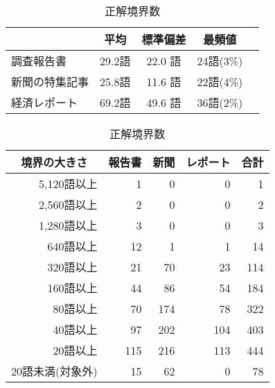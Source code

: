 \begin{table}[htbp]
\begin{minipage}[b]{7.5cm}
\begin{center}
\begin{tabular}{|l|c|c|c|c|}
                       & 平均   & 標準偏差 & 最頻値   \\ 
      \hline
      調査報告書       & 29.2語  & 22.0 語 & 24語(3\%)\\ 
      新聞の特集記事   & 25.8語  & 11.6 語 & 22語(4\%)\\ 
      経済レポート     & 69.2語  & 49.6 語 & 36語(2\%)\\ 
      \hline
    \end{tabular}
  \end{center}
  \bigskip
  \begin{center}
    \leavevmode
    \caption{正解境界数}
    \label{tab:正解境界数}
    \begin{tabular}{|r||r|r|r||r|}
    \hline
      \multicolumn{1}{|c||}{境界の大きさ}
      & \multicolumn{1}{c|}{報告書}
      & \multicolumn{1}{c|}{新聞}
      & \multicolumn{1}{c||}{レポート}
      & \multicolumn{1}{c|}{合計}\\
      \hline
      5,120語以上 &   1 &   0 &   0 &   1 \\
      2,560語以上 &   2 &   0 &   0 &   2 \\
      1,280語以上 &   3 &   0 &   0 &   3 \\
        640語以上 &  12 &   1 &   1 &  14 \\
        320語以上 &  21 &  70 &  23 & 114 \\
        160語以上 &  44 &  86 &  54 & 184 \\
         80語以上 &  70 & 174 &  78 & 322 \\
         40語以上 &  97 & 202 & 104 & 403 \\
         20語以上 & 115 & 216 & 113 & 444 \\
      \hline
       20語未満(対象外) & 15 & 62 & 0 & 78 \\
      \hline
    \end{tabular}
  \end{center}
  \end{minipage}
\end{table}





